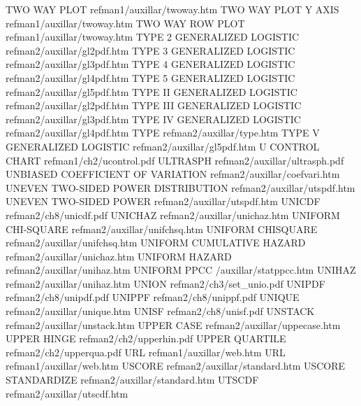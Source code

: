 TWO WAY PLOT                            refman1/auxillar/twoway.htm
TWO WAY PLOT Y AXIS                     refman1/auxillar/twoway.htm
TWO WAY ROW PLOT                        refman1/auxillar/twoway.htm
TYPE 2 GENERALIZED LOGISTIC             refman2/auxillar/gl2pdf.htm
TYPE 3 GENERALIZED LOGISTIC             refman2/auxillar/gl3pdf.htm
TYPE 4 GENERALIZED LOGISTIC             refman2/auxillar/gl4pdf.htm
TYPE 5 GENERALIZED LOGISTIC             refman2/auxillar/gl5pdf.htm
TYPE II GENERALIZED LOGISTIC            refman2/auxillar/gl2pdf.htm
TYPE III GENERALIZED LOGISTIC           refman2/auxillar/gl3pdf.htm
TYPE IV GENERALIZED LOGISTIC            refman2/auxillar/gl4pdf.htm
TYPE                                    refman2/auxillar/type.htm
TYPE V GENERALIZED LOGISTIC             refman2/auxillar/gl5pdf.htm
U CONTROL CHART                         refman1/ch2/ucontrol.pdf
ULTRASPH                                refman2/auxillar/ultrasph.pdf
UNBIASED  COEFFICIENT OF VARIATION      refman2/auxillar/coefvari.htm
UNEVEN TWO-SIDED POWER DISTRIBUTION     refman2/auxillar/utspdf.htm
UNEVEN TWO-SIDED POWER                  refman2/auxillar/utspdf.htm
UNICDF                                  refman2/ch8/unicdf.pdf
UNICHAZ                                 refman2/auxillar/unichaz.htm
UNIFORM CHI-SQUARE                      refman2/auxillar/unifchsq.htm
UNIFORM CHISQUARE                       refman2/auxillar/unifchsq.htm
UNIFORM CUMULATIVE HAZARD               refman2/auxillar/unichaz.htm
UNIFORM HAZARD                          refman2/auxillar/unihaz.htm
UNIFORM PPCC                            /auxillar/statppcc.htm
UNIHAZ                                  refman2/auxillar/unihaz.htm
UNION                                   refman2/ch3/set_unio.pdf
UNIPDF                                  refman2/ch8/unipdf.pdf
UNIPPF                                  refman2/ch8/unippf.pdf
UNIQUE                                  refman2/auxillar/unique.htm
UNISF                                   refman2/ch8/unisf.pdf
UNSTACK                                 refman2/auxillar/unstack.htm
UPPER CASE                              refman2/auxillar/uppecase.htm
UPPER HINGE                             refman2/ch2/upperhin.pdf
UPPER QUARTILE                          refman2/ch2/upperqua.pdf
URL                                     refman1/auxillar/web.htm
URL                                     refman1/auxillar/web.htm
USCORE                                  refman2/auxillar/standard.htm
USCORE STANDARDIZE                      refman2/auxillar/standard.htm
UTSCDF                                  refman2/auxillar/utscdf.htm
